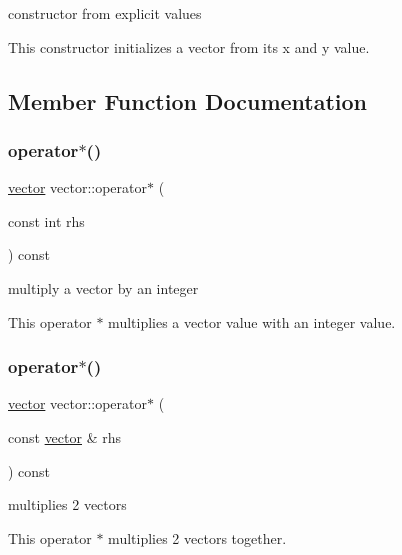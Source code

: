 constructor from explicit values 

This constructor initializes a vector from its x and y value. 

\subsection{Member Function Documentation}
\mbox{\label{classvector_ad4e924ee21af1367f8724b2d94db110e}} 
\subsubsection{\texorpdfstring{operator$\ast$()}{operator*()}\hspace{0.1cm}{\footnotesize\ttfamily [1/2]}}
{\footnotesize\ttfamily \hyperlink{classvector}{vector} vector\+::operator$\ast$ (\begin{DoxyParamCaption}\item[{const int}]{rhs }\end{DoxyParamCaption}) const\hspace{0.3cm}{\ttfamily [inline]}}



multiply a vector by an integer 

This operator $\ast$ multiplies a vector value with an integer value. \mbox{\label{classvector_a9ef97fde561d0998f1db1af7c9fbbff8}} 
\subsubsection{\texorpdfstring{operator$\ast$()}{operator*()}\hspace{0.1cm}{\footnotesize\ttfamily [2/2]}}
{\footnotesize\ttfamily \hyperlink{classvector}{vector} vector\+::operator$\ast$ (\begin{DoxyParamCaption}\item[{const \hyperlink{classvector}{vector} \&}]{rhs }\end{DoxyParamCaption}) const\hspace{0.3cm}{\ttfamily [inline]}}



multiplies 2 vectors 

This operator $\ast$ multiplies 2 vectors together. \mbox{\label{classvector_a182c6b1bb87ac682b95f0ee848c0221b}} 
